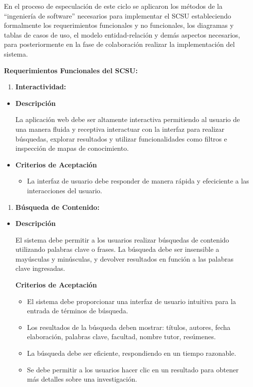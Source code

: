 \documentclass[
  12pt,
  openany]{book}
\providecommand{\tightlist}{%
  \setlength{\itemsep}{0pt}\setlength{\parskip}{0pt}}
\begin{document}
En el proceso de especulación de este ciclo se aplicaron los métodos de la ``ingeniería de software'' necesarios para implementar el SCSU estableciendo formalmente los requerimientos funcionales y no funcionales, los diagramas y tablas de casos de uso, el modelo entidad-relación y demás aspectos necesarios, para posteriormente en la fase de colaboración realizar la implementación del sistema.

\textbf{Requerimientos Funcionales del SCSU:}

\begin{enumerate}
\def\labelenumi{\arabic{enumi}.}
\tightlist
\item
  \textbf{Interactividad:}
\end{enumerate}

\begin{itemize}
\item
  \textbf{Descripción}

  La aplicación web debe ser altamente interactiva permitiendo al usuario de una manera fluida y receptiva interactuar con la interfaz para realizar búsquedas, explorar resultados y utilizar funcionalidades como filtros e inspección de mapas de conocimiento.
\item
  \textbf{Criterios de Aceptación}

  \begin{itemize}
  \tightlist
  \item
    La interfaz de usuario debe responder de manera rápida y efeciciente a las interacciones del usuario.
  \end{itemize}
\end{itemize}

\begin{enumerate}
\def\labelenumi{\arabic{enumi}.}
\setcounter{enumi}{1}
\tightlist
\item
  \textbf{Búsqueda de Contenido:}
\end{enumerate}

\begin{itemize}
\item
  \textbf{Descripción}

  El sistema debe permitir a los usuarios realizar búsquedas de contenido utilizando palabras clave o frases. La búsqueda debe ser insensible a mayúsculas y minúsculas, y devolver resultados en función a las palabras clave ingresadas.

  \textbf{Criterios de Aceptación}

  \begin{itemize}
  \tightlist
  \item
    El sistema debe proporcionar una interfaz de usuario intuitiva para la entrada de términos de búsqueda.
  \item
    Los resultados de la búsqueda deben mostrar: títulos, autores, fecha elaboración, palabras clave, facultad, nombre tutor, resúmenes.
  \item
    La búsqueda debe ser eficiente, respondiendo en un tiempo razonable.
  \item
    Se debe permitir a los usuarios hacer clic en un resultado para obtener más detalles sobre una investigación.
  \end{itemize}
\end{itemize}
\end{document}
